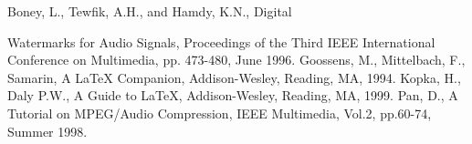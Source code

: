 \documentclass[a4paper,10pt]{article}
\begin{document}
\begin{thebibliography}
     Boney, L., Tewfik, A.H., and Hamdy, K.N., Digital
	
        Watermarks for Audio Signals, Proceedings of the Third IEEE
        International Conference on Multimedia, pp. 473-480, June 1996.
     Goossens, M., Mittelbach, F., Samarin, A LaTeX Companion, Addison-Wesley, Reading, MA, 1994.
     Kopka, H., Daly P.W., A Guide to LaTeX, Addison-Wesley, Reading, MA, 1999.
     Pan, D., A Tutorial on MPEG/Audio Compression, IEEE Multimedia, Vol.2, pp.60-74, Summer 1998.
\end{thebibliography}
\end{document}
